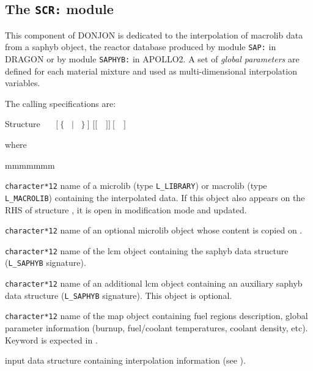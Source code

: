 \subsection{The {\tt SCR:} module}\label{sect:SCRData}

This component of DONJON is dedicated to the interpolation of
{\sc macrolib} data from a {\sc saphyb} object, the reactor database produced by module {\tt SAP:}
in DRAGON or by module {\tt SAPHYB:} in APOLLO2.\cite{apollo2} A set of {\sl global parameters} are defined for each material mixture and
used as multi-dimensional interpolation variables.

\vskip 0.02cm

The calling specifications are:

\begin{DataStructure}{Structure }
~\moc{:=}~~$[~\{$~ $|$ ~$\}~]$  $[[$~~$]]~[$~~$]$~\moc{::}~ \\
\end{DataStructure}

\noindent where
\begin{ListeDeDescription}{mmmmmmm}

\item[\dusa{MLIB}] {\tt character*12} name of a {\sc microlib} (type {\tt L\_LIBRARY}) or {\sc macrolib} (type {\tt L\_MACROLIB}) containing the interpolated data.
If this object also appears on the RHS of structure , it is open in modification mode and updated.

\item[\dusa{MLIB2}] {\tt character*12} name of an optional {\sc microlib} object whose content is copied on .

\item[\dusa{SAPNAM1}] {\tt character*12} name of the {\sc lcm} object containing the
{\sc saphyb} data structure ({\tt L\_SAPHYB} signature).

\item[\dusa{SAPNAM2}] {\tt character*12} name of an additional {\sc lcm} object containing an auxiliary
{\sc saphyb} data structure ({\tt L\_SAPHYB} signature). This object is optional.

\item[\dusa{MAPFL}] {\tt character*12} name of the {\sc map} object containing fuel regions description, global parameter
information (burnup, fuel/coolant temperatures, coolant density, etc). Keyword  is expected in .

\item[\dusa{scr\_data}] input data structure containing interpolation information (see ).

\end{ListeDeDescription}

